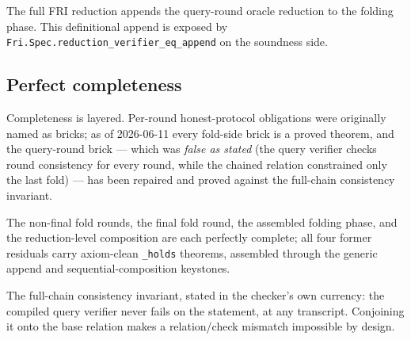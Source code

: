\begin{definition}\label{def:fri_reduction}
    The full FRI reduction appends the query-round oracle reduction to the folding phase.  This
    definitional append is exposed by \texttt{Fri.Spec.reduction\_verifier\_eq\_append} on the
    soundness side.
\end{definition}

\subsection{Perfect completeness}\label{sec:fri_completeness}

Completeness is layered.  Per-round honest-protocol obligations were originally named as
bricks; as of 2026-06-11 every fold-side brick is a proved theorem, and the query-round brick
--- which was \emph{false as stated} (the query verifier checks round consistency for every
round, while the chained relation constrained only the last fold) --- has been repaired and
proved against the full-chain consistency invariant.

\begin{theorem}\label{thm:fri_fold_completeness}
    The non-final fold rounds, the final fold round, the assembled folding phase, and the
    reduction-level composition are each perfectly complete; all four former residuals carry
    axiom-clean \texttt{\_holds} theorems, assembled through the generic append and
    sequential-composition keystones.
\end{theorem}

\begin{definition}\label{def:fri_query_chain_invariant}
    The full-chain consistency invariant, stated in the checker's own currency: the compiled
    query verifier never fails on the statement, at any transcript.  Conjoining it onto the
    base relation makes a relation/check mismatch impossible by design.
\end{definition}

